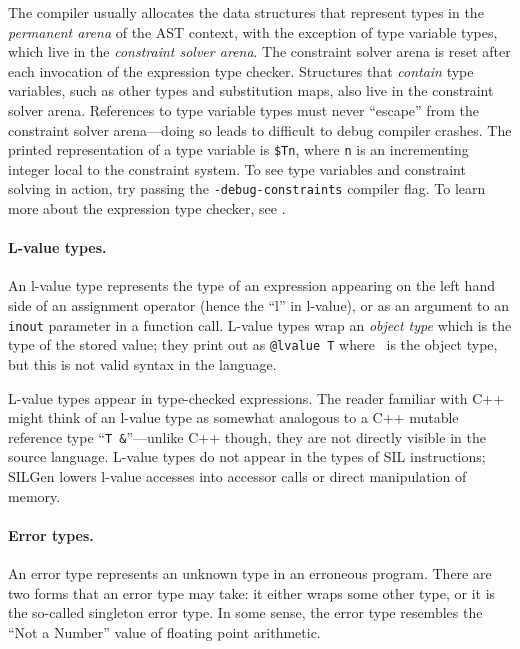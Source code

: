 \documentclass[../generics]{subfiles}
\begin{document}
The compiler usually allocates the data structures that represent types in the \emph{permanent arena} of the AST context, with the exception of type variable types, which live in the \emph{constraint solver arena}. The constraint solver arena is reset after each invocation of the expression type checker. Structures that \emph{contain} type variables, such as other types and substitution maps, also live in the constraint solver arena. References to type variable types must never ``escape'' from the constraint solver arena---doing so leads to difficult to debug compiler crashes. The printed representation of a type variable is \texttt{\$Tn}, where \texttt{n} is an incrementing integer local to the constraint system. To see type variables and constraint solving in action, try passing the \texttt{-debug-constraints} compiler flag. To learn more about the expression type checker, see \cite{typechecker,diagnosticsblog}.

\paragraph{L-value types.}
An l-value type represents the type of an expression appearing on the left hand side of an assignment operator (hence the ``l'' in l-value), or as an argument to an \texttt{inout} parameter in a function call. L-value types wrap an \emph{object type} which is the type of the stored value; they print out as \verb|@lvalue T| where \tT\ is the object type, but this is not valid syntax in the language.

L-value types appear in type-checked expressions. The reader familiar with C++ might think of an l-value type as somewhat analogous to a C++ mutable reference type ``\verb|T &|''---unlike C++ though, they are not directly visible in the source language. L-value types do not appear in the types of SIL instructions; SILGen lowers l-value accesses into accessor calls or direct manipulation of memory.

\paragraph{Error types.}
An error type represents an unknown type in an erroneous program. There are two forms that an error type may take: it either wraps some other type, or it is the so-called singleton error type. In some sense, the error type resembles the ``Not a Number'' value of floating point arithmetic.
\end{document}
